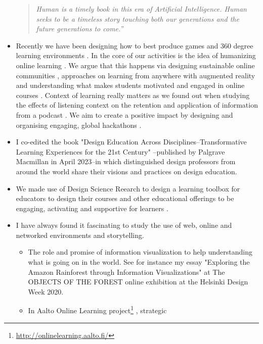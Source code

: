 \documentclass[11pt,letterpaper]{article}
\newenvironment{itquote}
{\begin{quote}\itshape}
{\end{quote}}
\begin{document}
\begin{itemize}
\begin{itquote}
Human is a timely book in this era of Artificial Intelligence. Human seeks to be a timeless story touching both our generations and the future generations to come.''
\end{itquote}
  \item Recently we have been designing how to best produce games \cite{gamejams-2021,game-production-2022,Promotypes2023,templating-games-2024} and 360 degree learning environments \cite{production-pipeline-360}. In the core of our activities is the idea of humanizing online learning \cite{humanizing-2024}. We argue that this happens via designing sustainable online communities \cite{design-community-2024}, approaches on learning from anywhere with augmented reality \cite{CPLJ-AR-2024,learn-anywhere-ar-2024} and understanding what makes students motivated and engaged in online courses \cite{students-engagement-2024}. Context of learning really matters as we found out when studying the effects of listening context on the retention and application of information from a podcast \cite{podcast-retention-2024}. We aim to create a positive impact by designing and organising engaging, global hackathons \cite{hacking-2024}. 
  \item I co-edited the book "Design Education Across Disciplines--Transformative Learning Experiences for the 21st Century" \cite{DesignEducation2023}--published by Palgrave Macmillan in April 2023--in which distinguished design professors from around the world share their visions and practices on design education.
  \item We made use of Design Science Reearch to design a learning toolbox for educators to design their courses and other educational offerings to be engaging, activating and supportive for learners \cite{designing-toolbox-2022}.
  \item I have always found it fascinating to study the use of web, online and
  networked environments and storytelling. 
   \begin{itemize}
    \item The role and promise of information visualization to help understanding what is going on in the world. See for instance my essay "Exploring the Amazon Rainforest through Information Visualizations" \cite{exploration-2020} at The OBJECTS OF THE FOREST online exhibition at the Helsinki Design Week 2020.
    \item In Aalto Online Learning
    project\footnote{\url{http://onlinelearning.aalto.fi/}}
    \cite{aalto-online-learning-2017,transforming-uni-2018,designing-learning-2020}, strategic

\end{itemize}
\end{itemize}
\end{document}
